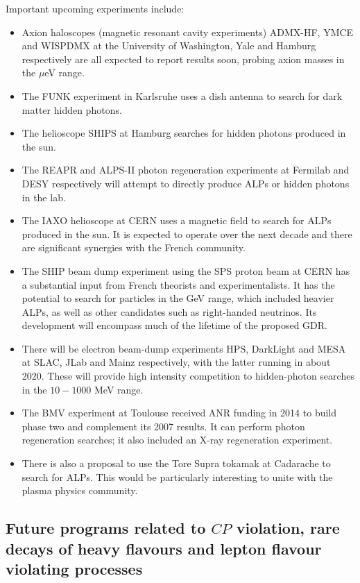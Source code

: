 Important upcoming experiments include:
\begin{itemize}
\item Axion haloscopes (magnetic resonant cavity experiments) ADMX-HF, YMCE and WISPDMX at the University of Washington, Yale and Hamburg respectively are all expected to report results soon, probing axion masses in the $\mu$eV range. 
\item The FUNK experiment in Karlsruhe uses a dish antenna to search for dark matter hidden photons.
\item The helioscope SHIPS at Hamburg searches for hidden photons produced in the sun.
\item The REAPR and ALPS-II photon regeneration experiments at Fermilab and DESY respectively will attempt to directly produce ALPs or hidden photons in the lab.
\item The IAXO helioscope at CERN uses a magnetic field to search for ALPs produced in the sun. It is expected to operate over the next decade and there are significant synergies with the French community.
\item The SHIP  beam dump experiment using the SPS proton beam at CERN has a substantial input from French theorists and experimentalists. It has the potential to search for particles in the GeV range, which included heavier ALPs, as well as other candidates such as right-handed neutrinos. Its development will encompass much of the lifetime of the proposed GDR.
\item There will be electron beam-dump experiments HPS, DarkLight and MESA at SLAC, JLab and Mainz respectively, with the latter running in about 2020. These will provide high intensity competition to hidden-photon searches in the $10-1000$ MeV range.
\item The BMV experiment at Toulouse received ANR funding in 2014 to build phase two and complement its 2007 results. It can perform photon regeneration searches; it also included an X-ray regeneration experiment.
\item There is also a proposal to use the Tore Supra tokamak at Cadarache to search for ALPs. This would be particularly interesting to unite with the plasma physics community. 
\end{itemize}





\subsection{Future programs related to $CP$ violation, rare decays of heavy flavours and lepton flavour violating processes}   


